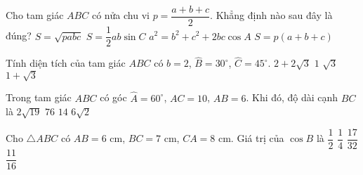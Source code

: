 \begin{ex}
	Cho tam giác $ABC$ có nửa chu vi $p=\dfrac{a+b+c}{2}$. Khẳng định nào sau đây là đúng?
	\choice
	{$S=\sqrt{pabc}$}
	{\True $S=\dfrac12 ab \sin C$}
	{$a^2=b^2+c^2+2bc\cos A$}
	{$S=p(a+b+c)$}
\end{ex}
\begin{ex}
	Tính diện tích của tam giác $ABC$ có $b=2$, $\widehat{B}=30^\circ$, $\widehat{C}=45^\circ$.
	\choice
	{$2+2\sqrt{3}$}
	{$1$}
	{$\sqrt{3}$}
	{\True $1+\sqrt{3}$}
\end{ex}
\begin{ex}
	Trong tam giác $ABC$ có góc $\widehat{A}=60^{\circ}$, $AC=10$, $AB=6$. Khi đó, độ dài cạnh $BC$ là
	\choice
	{\True $2\sqrt{19}$}
	{$76$}
	{$14$}
	{$6\sqrt{2}$}
\end{ex}
\begin{ex}
	Cho $\triangle ABC$ có $AB=6$ cm, $BC=7$ cm, $CA=8$ cm. Giá trị của $\cos B$ là
	\choice
	{$\dfrac{1}{2}$}
	{\True $\dfrac{1}{4}$}
	{$\dfrac{17}{32}$}
	{$\dfrac{11}{16}$}
\end{ex}
